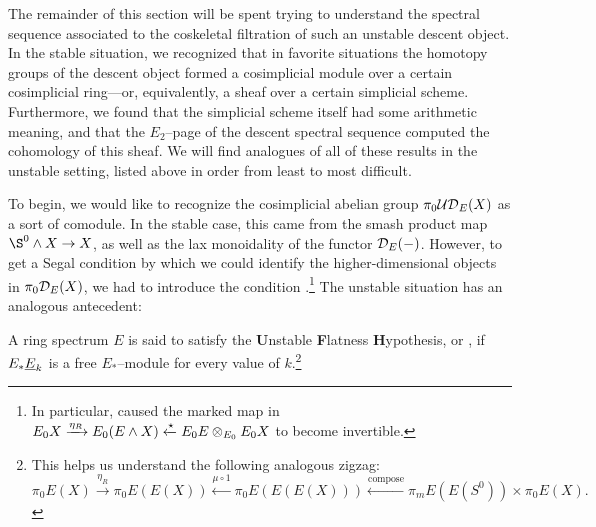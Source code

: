 The remainder of this section will be spent trying to understand the spectral sequence associated to the coskeletal filtration of such an unstable descent object.  In the stable situation, we recognized that in favorite situations the homotopy groups of the descent object formed a cosimplicial module over a certain cosimplicial ring---or, equivalently, a sheaf over a certain simplicial scheme.  Furthermore, we found that the simplicial scheme itself had some arithmetic meaning, and that the $E_2$--page of the descent spectral sequence computed the cohomology of this sheaf.  We will find analogues of all of these results in the unstable setting, listed above in order from least to most difficult.

To begin, we would like to recognize the cosimplicial abelian group $\pi_0 \mathcal{UD}_E(X)$ as a sort of comodule.  In the stable case, this came from the smash product map $\S^0 \sm X \to X$, as well as the lax monoidality of the functor $\mathcal{D}_E(-)$.  However, to get a Segal condition by which we could identify the higher-dimensional objects in $\pi_0 \mathcal{D}_E(X)$, we had to introduce the condition {\FH}.\footnote{In particular, {\FH} caused the marked map in $E_0 X \xrightarrow{\eta_R} E_0(E \wedge X) \xleftarrow{\star} E_0 E \otimes_{E_0} E_0 X$ to become invertible.}  The unstable situation has an analogous antecedent:

\begin{definition}
A ring spectrum $E$ is said to satisfy the \textbf{U}nstable \textbf{F}latness \textbf{H}ypothesis, or \UFH, if $E_* \underline{\smash{E}}_{k}$ is a free $E_*$--module for every value of $k$.\footnote{This helps us understand the following analogous zigzag: \[\pi_0 E(X) \xrightarrow{\eta_R} \pi_0 E(E(X)) \xleftarrow{\mu \circ 1} \pi_0 E(E(E(X))) \xleftarrow{\mathrm{compose}} \pi_m E(E(S^0)) \times \pi_0 E(X).\]}
\end{definition}


